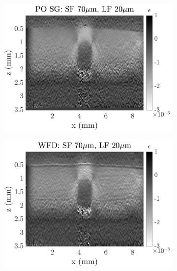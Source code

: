 \begin{figure}[h]
\begin{subfigure}{0.49\textwidth}
        \includegraphics[width=\textwidth]{appendix_figs/posg_fr70_lr20.png}
    \end{subfigure}
    \begin{subfigure}{0.49\textwidth}
    	\centering
        \includegraphics[width=\textwidth]{appendix_figs/wfd_fr70_lr20.png}
    \end{subfigure}
    \\
    \begin{subfigure}{0.49\textwidth}
    	\centering

\end{subfigure}
\end{figure}
